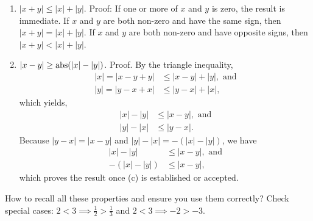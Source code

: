\begin{enumerate}
\renewcommand{\labelenumi}{(\alph{enumi})}
\setlength{\itemsep}{.2cm}
    
    \item $|x + y| \le |x| + |y|$. Proof: If one or more of $x$ and $y$ is zero, the result is immediate. If $x$ and $y$ are both non-zero and have the same sign, then $|x + y| = |x| + |y|$. If $x$ and $y$ are both non-zero and have opposite signs, then $|x + y| < |x| + |y|$.

    \item $|x-y| \ge {\rm abs}(|x| -|y|)$. Proof. By the triangle inequality,
    \begin{align*}
        |x| = |x-y+y| & \le |x-y| + |y|, \text{ and} \\
        |y| = |y-x+x| & \le |y-x| + |x|,
    \end{align*}
    which yields,
   \begin{align*}
        |x|- |y| & \le |x-y|, \text{ and} \\
        |y| - |x| & \le |y-x|.
    \end{align*}    
 Because $|y-x| = |x-y|$ and $|y| - |x| = -\left(|x|- |y|\right)$, we have
   \begin{align*}
        |x|- |y| & \le |x-y|, \text{ and} \\
       -\left(|x|- |y|\right) & \le |x-y|,
    \end{align*}
 which proves the result once (c) is established or accepted.

\end{enumerate}

\Qed


\begin{rem} How to recall all these properties and ensure you use them correctly? Check special cases: $2 < 3 \implies \frac{1}{2} > \frac{1}{3}$ and  $2 < 3 \implies -2 > -3$.      
\end{rem}

